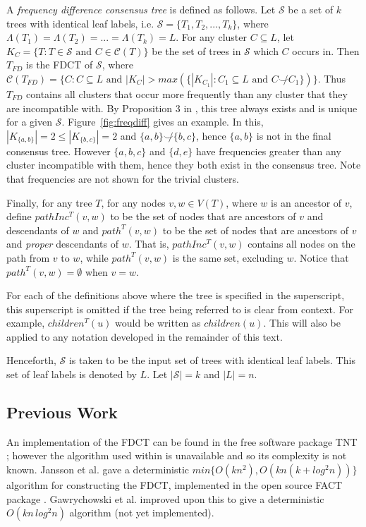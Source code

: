 \documentclass{article}
\newcommand{\compatible}{\smile}
\newcommand{\leafset}{\Lambda}
\begin{document}
    A \textit{frequency difference consensus tree} is defined as follows. Let $\mathcal{S}$ be a set of $k$ trees with identical leaf labels, i.e. $\mathcal{S} = \{T_1, T_2, ..., T_k\}$, where $\leafset(T_1) = \leafset(T_2) = ... = \leafset(T_k) = L$. For any cluster $C \subseteq L$, let $K_C = \{T : T \in \mathcal{S} \text{ and } C \in \mathcal{C}(T)\}$ be the set of trees in $\mathcal{S}$ which $C$ occurs in. Then $T_{FD}$ is the FDCT of $\mathcal{S}$, where $\mathcal{C}(T_{FD}) = \{C : C \subseteq L \text{ and } |K_C| > max(\{|K_{C_1}| : C_1 \subseteq L \text{ and } C \not\compatible C_1\})\}$. Thus $T_{FD}$ contains all clusters that occur more frequently than any cluster that they are incompatible with. By Proposition $3$ in \cite{steel2014axiomatic}, this tree always exists and is unique for a given $\mathcal{S}$. Figure~\ref{fig:freqdiff} gives an example. In this, $|K_{\{a, b\}}| = 2 \leq |K_{\{b, c\}}| = 2$ and $\{a, b\} \not\compatible \{b, c\}$, hence $\{a, b\}$ is not in the final consensus tree. However $\{a, b, c\}$ and $\{d, e\}$ have frequencies greater than any cluster incompatible with them, hence they both exist in the consensus tree. Note that frequencies are not shown for the trivial clusters.

    Finally, for any tree $T$, for any nodes $v, w \in V(T)$, where $w$ is an ancestor of $v$, define $pathInc^{T}(v, w)$ to be the set of nodes that are ancestors of $v$ and descendants of $w$ and $path^{T}(v, w)$ to be the set of nodes that are ancestors of $v$ and \textit{proper} descendants of $w$. That is, $pathInc^{T}(v, w)$ contains all nodes on the path from $v$ to $w$, while $path^{T}(v, w)$ is the same set, excluding $w$. Notice that $path^{T}(v, w) = \emptyset$ when $v = w$.

    For each of the definitions above where the tree is specified in the superscript, this superscript is omitted if the tree being referred to is clear from context. For example, $children^T(u)$ would be written as $children(u)$. This will also be applied to any notation developed in the remainder of this text.

    Henceforth, $\mathcal{S}$ is taken to be the input set of trees with identical leaf labels. This set of leaf labels is denoted by $L$. Let $|\mathcal{S}| = k$ and $|L| = n$.

    \subsection{Previous Work}
    An implementation of the FDCT can be found in the free software package TNT \cite{goloboff2008tnt}; however the algorithm used within is unavailable and so its complexity is not known. Jansson et al. \cite{jansson2018algorithms} gave a deterministic $min\{O(kn^2), O(kn(k + log^2 n))\}$ algorithm for constructing the FDCT, implemented in the open source FACT package \cite{jansson2016improved}. Gawrychowski et al. \cite{gawrychowski2017faster} improved upon this to give a deterministic $O(kn\,log^2n)$ algorithm (not yet implemented).
\end{document}
